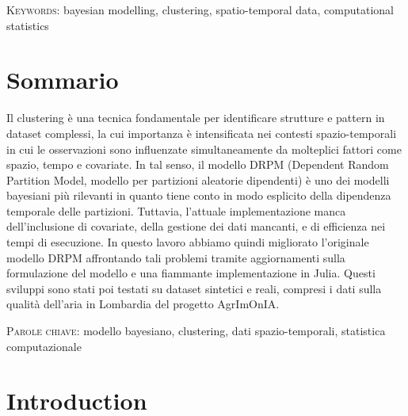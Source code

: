 \documentclass[12pt,	%
	a4paper,		%
	twoside,		%
	openright,		%
	titlepage,%
	]{book}
\theoremstyle{definition}
\begin{document}
\textsc{Keywords:} bayesian modelling, clustering, spatio-temporal data, computational statistics


\cleardoublepage

\chapter*{Sommario}

Il clustering è una tecnica fondamentale per identificare strutture e pattern in dataset complessi, la cui importanza è intensificata nei contesti spazio-temporali in cui le osservazioni sono influenzate simultaneamente da molteplici fattori come spazio, tempo e covariate. In tal senso, il modello DRPM (Dependent Random Partition Model, modello per partizioni aleatorie dipendenti) è uno dei modelli bayesiani più rilevanti in quanto tiene conto in modo esplicito della dipendenza temporale delle partizioni. Tuttavia, l'attuale implementazione manca dell'inclusione di covariate, della gestione dei dati mancanti, e di efficienza nei tempi di esecuzione. In questo lavoro abbiamo quindi migliorato l'originale modello DRPM affrontando tali problemi tramite aggiornamenti sulla formulazione del modello e una fiammante implementazione in Julia. Questi sviluppi sono stati poi testati su dataset sintetici e reali, compresi i dati sulla qualità dell'aria in Lombardia del progetto AgrImOnIA.

\textsc{Parole chiave:} modello bayesiano, clustering, dati spazio-temporali, statistica computazionale


\cleardoublepage

    \tableofcontents


\listoffigures
\listoftables




\cleardoublepage
\mainmatter
% 
% 
% 
% 
% 

\chapter{Introduction}
\end{document}

